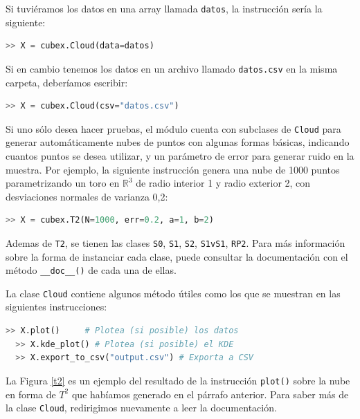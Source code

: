 \documentclass[12pt,a4paper,twoside]{article} %
\theoremstyle{plain}
\theoremstyle{definition}
\newcommand{\R}{\mathbb{R}}
\begin{document}
Si tuviéramos los datos en una array llamada \texttt{datos}, la instrucción sería la siguiente:
\begin{lstlisting}[language=python]
  >> X = cubex.Cloud(data=datos)
\end{lstlisting}

Si en cambio tenemos los datos en un archivo llamado \texttt{datos.csv} en la misma carpeta, deberíamos escribir:
\begin{lstlisting}[language=python]
  >> X = cubex.Cloud(csv="datos.csv")
\end{lstlisting}

Si uno sólo desea hacer pruebas, el módulo cuenta con subclases de \texttt{Cloud} para generar automáticamente nubes de puntos con algunas formas básicas, indicando cuantos puntos se desea utilizar, y un parámetro de error para generar ruido en la muestra. Por ejemplo, la siguiente instrucción genera una nube de 1000 puntos parametrizando un toro en $\R^3$ de radio interior 1 y radio exterior 2, con desviaciones normales de varianza 0,2:
\begin{lstlisting}[language=python]
  >> X = cubex.T2(N=1000, err=0.2, a=1, b=2)
\end{lstlisting}
Ademas de \texttt{T2}, se tienen las clases \texttt{S0}, \texttt{S1}, \texttt{S2}, \texttt{S1vS1}, \texttt{RP2}. Para más información sobre la forma de instanciar cada clase, puede consultar la documentación con el método \texttt{\_\_doc\_\_()} de cada una de ellas.

La clase \texttt{Cloud} contiene algunos método útiles como los que se muestran en las siguientes instrucciones:
\begin{lstlisting}[language=python]
  >> X.plot()     # Plotea (si posible) los datos
  >> X.kde_plot() # Plotea (si posible) el KDE
  >> X.export_to_csv("output.csv") # Exporta a CSV 
\end{lstlisting}
La Figura \ref{t2} es un ejemplo del resultado de la instrucción \texttt{plot()} sobre la nube en forma de $T^2$ que habíamos generado en el párrafo anterior. Para saber más de la clase \texttt{Cloud}, redirigimos nuevamente a leer la documentación.
\end{document}
